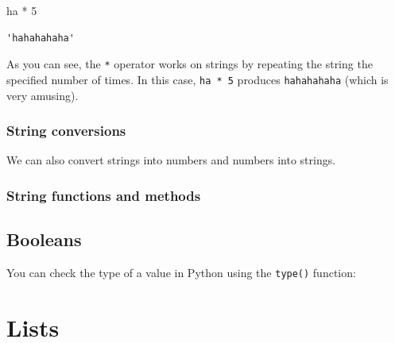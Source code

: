 \documentclass[
  letterpaper,
  DIV=11,
  numbers=noendperiod]{scrreprt}
\newenvironment{Shaded}{\begin{snugshade}}{\end{snugshade}}
\newcommand{\CommentTok}[1]{\textcolor[rgb]{0.37,0.37,0.37}{#1}}
\newcommand{\DecValTok}[1]{\textcolor[rgb]{0.68,0.00,0.00}{#1}}
\newcommand{\OperatorTok}[1]{\textcolor[rgb]{0.37,0.37,0.37}{#1}}
\begin{document}
\begin{tcolorbox}[enhanced jigsaw, bottomtitle=1mm, colframe=quarto-callout-note-color-frame, toptitle=1mm, colbacktitle=quarto-callout-note-color!10!white, rightrule=.15mm, leftrule=.75mm, opacityback=0, breakable, coltitle=black, left=2mm, opacitybacktitle=0.6, titlerule=0mm, bottomrule=.15mm, title=\textcolor{quarto-callout-note-color}{\faInfo}\hspace{0.5em}{Solution}, arc=.35mm, colback=white, toprule=.15mm]

\begin{Shaded}
\begin{Highlighting}[]
\CommentTok{\textquotesingle{}ha\textquotesingle{}} \OperatorTok{*} \DecValTok{5}
\end{Highlighting}
\end{Shaded}

\begin{verbatim}
'hahahahaha'
\end{verbatim}

As you can see, the \texttt{*} operator works on strings by repeating
the string the specified number of times. In this case,
\texttt{\textquotesingle{}ha\textquotesingle{}\ *\ 5} produces
\texttt{\textquotesingle{}hahahahaha\textquotesingle{}} (which is very
amusing).

\end{tcolorbox}

\subsubsection{String conversions}\label{string-conversions}

We can also convert strings into numbers and numbers into strings.

\subsubsection{String functions and
methods}\label{string-functions-and-methods}

\subsection{Booleans}\label{booleans}

You can check the type of a value in Python using the \texttt{type()}
function:

\section{Lists}\label{lists}
\end{document}
